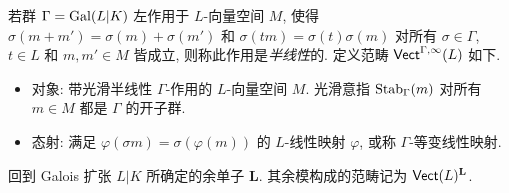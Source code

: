 \begin{definition}\label{def:semilinear-action}
	若群 $\Gamma = \operatorname{Gal}(L|K)$ 左作用于 $L$-向量空间 $M$, 使得 $\sigma(m + m') = \sigma(m) + \sigma(m')$ 和 $\sigma(tm) = \sigma(t)\sigma(m)$ 对所有 $\sigma \in \Gamma$, $t \in L$ 和 $m, m' \in M$ 皆成立, 则称此作用是\emph{半线性}的. 定义范畴 $\mathsf{Vect}^{\Gamma, \infty}(L)$ 如下.
	\begin{itemize}
		\item 对象: 带光滑半线性 $\Gamma$-作用的 $L$-向量空间 $M$. 光滑意指 $\operatorname{Stab}_{\Gamma}(m)$ 对所有 $m \in M$ 都是 $\Gamma$ 的开子群.
		\item 态射: 满足 $\varphi(\sigma m) = \sigma (\varphi(m))$ 的 $L$-线性映射 $\varphi$, 或称 $\Gamma$-等变线性映射.
	\end{itemize}
\end{definition}

回到 Galois 扩张 $L|K$ 所确定的余单子 $\mathbf{L}$. 其余模构成的范畴记为 $\mathsf{Vect}(L)^{\mathbf{L}}$.

